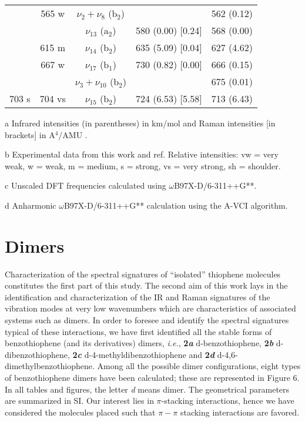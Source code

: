 \begin{table}[H]
\begin{center}
\begin{threeparttable}[b]
\begin{tabular}{c c c c c}
					& 565 w & $\nu_{2} + \nu_{8}$ (b$_{2}$) &   & 562 (0.12)\\
					&   &   $\nu_{13}$ (a$_{2}$) & 580 (0.00) [0.24] & 568 (0.00) \\
					& 615 m & $\nu_{14}$ (b$_{2}$) & 635 (5.09) [0.04] & 627 (4.62)\\
					& 667 w & $\nu_{17}$ (b$_{1}$) & 730 (0.82) [0.00] & 666 (0.15)\\
					&   &  $\nu_{3} + \nu_{10}$ (b$_{2}$) &  & 675 (0.01)\\
					703 s &704 vs &  $\nu_{15}$ (b$_{2}$) & 724 (6.53) [5.58] & 713 (6.43) \\
					\bottomrule 
				\end{tabular}
				
				\begin{tablenotes}
					\item[a] Infrared intensities (in parentheses) in km/mol and Raman intensities [in brackets] in A$^{4}$/AMU .
					\item[b] Experimental data from this work and ref\cite{bree1971vibrations}. Relative intensities: vw = very weak, w = weak, m = medium, s = strong, vs = very strong, sh = shoulder.
					\item[c] Unscaled DFT frequencies calculated using $\omega$B97X-D/6-311++G**.
					\item[d] Anharmonic $\omega$B97X-D/6-311++G** calculation using the A-VCI algorithm\cite{garnier2016adaptive}.
				\end{tablenotes}
			\end{threeparttable}
		\end{center}
	\end{table}
	
	
	
	
	
	\section*{Dimers}
	
	Characterization of the spectral signatures of “isolated” thiophene molecules constitutes the first part of this study. The second aim of this work lays in the identification and characterization of the IR and Raman signatures of the vibration modes at very low wavenumbers which are characteristics of associated systems such as dimers. In order to foresee and identify the spectral signatures typical of these interactions, we have first identified all the stable forms of benzothiophene (and its derivatives) dimers, \textit{i.e.}, \textbf{2\textit{a}} d-benzothiophene, \textbf{2\textit{b}} d-dibenzothiophene, \textbf{2\textit{c}} d-4-methyldibenzothiophene and \textbf{2\textit{d}} d-4,6-dimethylbenzothiophene. Among all the possible dimer configurations, eight types of benzothiophene dimers have been calculated; these are represented in Figure 6. In all tables and figures, the letter \textit{d} means dimer. The geometrical parameters are summarized in SI.  Our interest lies in $\pi$-stacking interactions, hence we have considered the molecules placed such that $\pi-\pi$ stacking interactions are favored.
	

